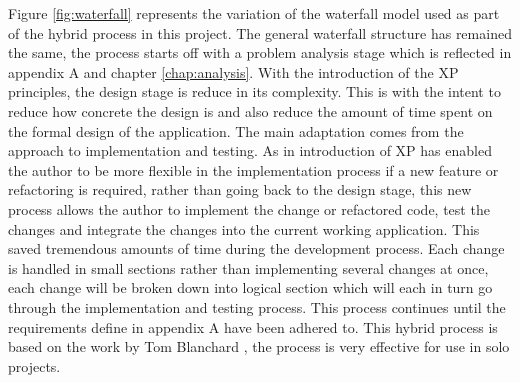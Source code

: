 Figure \ref{fig:waterfall} represents the variation of the waterfall model used as part of the hybrid process in this project. The general waterfall structure has remained the same, the process starts off with a problem analysis stage which is reflected in appendix A and chapter \ref{chap:analysis}. With the introduction of the XP principles, the design stage is reduce in its complexity. This is with the intent to reduce how concrete the design is and also reduce the amount of time spent on the formal design of the application. The main adaptation comes from the approach to implementation and testing. As in introduction of XP has enabled the author to be more flexible in the implementation process if a new feature or refactoring is required, rather than going back to the design stage, this new process allows the author to implement the change or refactored code, test the changes and integrate the changes into the current working application. This saved tremendous amounts of time during the development process. Each change is handled in small sections rather than implementing several changes at once, each change will be broken down into logical section which will each in turn go through the implementation and testing process. This process continues until the requirements define in appendix A have been adhered to. This hybrid process is based on the work by Tom Blanchard \cite{tblanch:diss}, the process is very effective for use in solo projects.